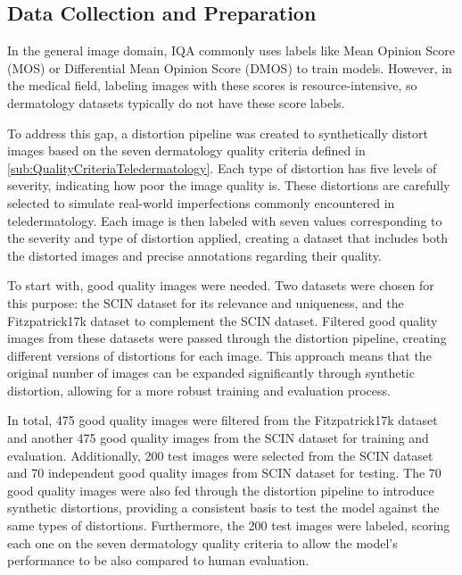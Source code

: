\subsection{Data Collection and Preparation} 
\label{sub:DataCollection}
In the general image domain, IQA commonly uses labels like Mean Opinion Score (MOS) or Differential Mean Opinion Score (DMOS) to train models. However, in the medical field, labeling images with these scores is resource-intensive, so dermatology datasets typically do not have these score labels. \par
\vspace{\baselineskip}
\noindent
To address this gap, a distortion pipeline was created to synthetically distort images based on the seven dermatology quality criteria defined in \autoref{sub:QualityCriteriaTeledermatology}. Each type of distortion has five levels of severity, indicating how poor the image quality is. These distortions are carefully selected to simulate real-world imperfections commonly encountered in teledermatology. Each image is then labeled with seven values corresponding to the severity and type of distortion applied, creating a dataset that includes both the distorted images and precise annotations regarding their quality. \par
\vspace{\baselineskip}
\noindent
To start with, good quality images were needed. Two datasets were chosen for this purpose: the SCIN \autocite{SCIN} dataset for its relevance and uniqueness, and the Fitzpatrick17k \autocite{F17K} dataset to complement the SCIN dataset. Filtered good quality images from these datasets were passed through the distortion pipeline, creating different versions of distortions for each image. This approach means that the original number of images can be expanded significantly through synthetic distortion, allowing for a more robust training and evaluation process. \par 
\clearpage
\noindent
In total, 475 good quality images were filtered from the Fitzpatrick17k \autocite{F17K} dataset and another 475 good quality images from the SCIN \autocite{SCIN} dataset for training and evaluation. Additionally, 200 test images were selected from the SCIN dataset and 70 independent good quality images from SCIN dataset for testing. The 70 good quality images were also fed through the distortion pipeline to introduce synthetic distortions, providing a consistent basis to test the model against the same types of distortions. Furthermore, the 200 test images were labeled, scoring each one on the seven dermatology quality criteria to allow the model’s performance to be also compared to human evaluation. \par
